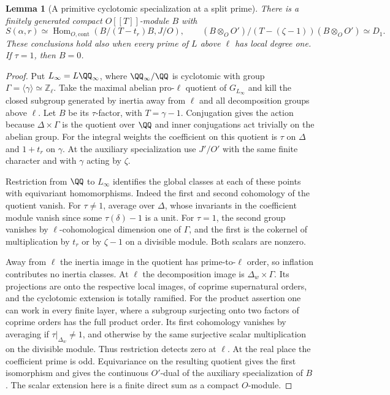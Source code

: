 \documentclass[a4paper,11pt]{article}
\newtheorem{lemma}[proposition]{Lemma}
\theoremstyle{definition}
\theoremstyle{remark}
\newcommand{\ZZ}{\mathbb Z}\newcommand{\ord}{\operatorname{ord}}
\numberwithin{equation}{section}
\begin{document}
\begin{lemma}[A primitive cyclotomic specialization at a split prime]\leavevmode
\label{lem:primitiveclass502}
There is a finitely generated compact \(O[[T]]\)-module \(B\) with
\[
 S(\alpha,r)\simeq
   \operatorname{Hom}_{O,\mathrm{cont}}(B/(T-t_r)B,J/O),\qquad
 (B\otimes_O O')/(T-(\zeta-1))(B\otimes_O O')\simeq D_1 .
\]
These conclusions hold also when every prime of \(L\) above
\(\ell\) has local degree one. If \(\tau=1\), then \(B=0\).
\end{lemma}
\begin{proof}
Put \(L_\infty=L\QQ_\infty\), where \(\QQ_\infty/\QQ\) is
cyclotomic with group \(\Gamma=\langle\gamma\rangle\simeq\ZZ_\ell\).
Take the maximal abelian pro-\(\ell\) quotient of \(G_{L_\infty}\)
and kill the closed subgroup generated by inertia away from
\(\ell\) and all decomposition groups above \(\ell\).
Let \(B\) be its \(\tau\)-factor, with \(T=\gamma-1\).
Conjugation gives the action because \(\Delta\times\Gamma\) is
the quotient over \(\QQ\) and inner conjugations act trivially
on the abelian group. For the integral weights the coefficient
on this quotient is \(\tau\) on \(\Delta\) and \(1+t_r\) on
\(\gamma\). At the auxiliary specialization use \(J'/O'\)
with the same finite character and with \(\gamma\) acting by \(\zeta\).

Restriction from \(\QQ\) to \(L_\infty\) identifies the global
classes at each of these points with equivariant homomorphisms.
Indeed the first and second cohomology of the quotient vanish.
For \(\tau\ne1\), average over \(\Delta\), whose invariants
in the coefficient module vanish since some \(\tau(\delta)-1\)
is a unit. For \(\tau=1\), the second group vanishes by
\(\ell\)-cohomological dimension one of \(\Gamma\), and the
first is the cokernel of multiplication by \(t_r\) or by
\(\zeta-1\) on a divisible module. Both scalars are nonzero.

Away from \(\ell\) the inertia image in the quotient has
prime-to-\(\ell\) order, so inflation contributes no inertia
classes. At \(\ell\) the decomposition image is
\(\Delta_w\times\Gamma\). Its projections are onto the respective
local images, of coprime supernatural orders, and the cyclotomic
extension is totally ramified. For the product assertion one can
work in every finite layer, where a subgroup surjecting onto two
factors of coprime orders has the full product order. Its first
cohomology vanishes by averaging if \(\tau|_{\Delta_w}\ne1\),
and otherwise by the same surjective scalar multiplication on
the divisible module. Thus restriction detects zero at \(\ell\).
At the real place the coefficient prime is odd. Equivariance
on the resulting quotient gives the first isomorphism and gives
the continuous \(O'\)-dual of the auxiliary specialization of
\(B\). The scalar extension here is a finite direct sum as a
compact \(O\)-module.


\end{proof}
\end{document}
